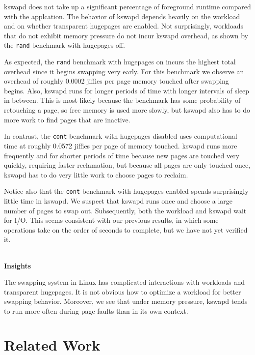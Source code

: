 \documentclass[twocolumn,11pt]{article}
\begin{document}
kswapd does not take up a significant percentage of foreground runtime compared
with the applcation. The behavior of kswapd depends heavily on the workload and
on whether transparent hugepages are enabled. Not surprisingly, workloads that
do not exhibit memory pressure do not incur kswapd overhead, as shown by the
\texttt{rand} benchmark with hugepages off.

As expected, the \texttt{rand} benchmark with hugepages on incurs the highest
total overhead since it begins swapping very early. For this benchmark we
observe an overhead of roughly 0.0002 jiffies per page memory touched after
swapping begins. Also, kswapd runs for longer periods of time with longer
intervals of sleep in between. This is most likely because the benchmark has
some probability of retouching a page, so free memory is used more slowly, but
kswapd also has to do more work to find pages that are inactive.

In contrast, the \texttt{cont} benchmark with hugepages disabled uses
computational time at roughly 0.0572 jiffies per page of memory touched.
kswapd runs more frequently and for shorter periods of time because new pages
are touched very quickly, requiring faster reclamation, but because all pages
are only touched once, kswapd has to do very little work to choose pages to
reclaim.

Notice also that the \texttt{cont} benchmark with hugepages enabled spends
surprisingly little time in kswapd. We suspect that kswapd runs once and choose
a large number of pages to swap out. Subsequently, both the workload and kswapd
wait for I/O. This seems consistent with our previous results, in which some
operations take on the order of seconds to complete, but we have not yet
verified it.

~\\ \textbf{Insights} 

The swapping system in Linux has complicated interactions with workloads and
transparent hugepages. It is not obvious how to optimize a workload for better
swapping behavior. Moreover, we see that under memory pressure, kswapd tends to
run more often during page faults than in its own context.

\section{Related Work}

\end{document}
